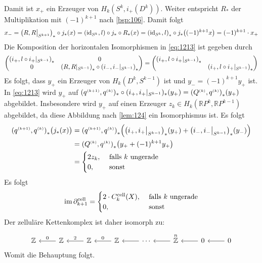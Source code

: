 \begin{beweis}
	Damit ist $x_+$ ein Erzeuger von $H_k(S^k,i_+(D^k))$. 
	Weiter entspricht $R_*$ der Multiplikation mit $(-1)^{k+1}$ nach \autoref{bsp:106}. Damit folgt
	\begin{align*}
		 x_- = \enbrace*{R,R\big|_{S^{k+1}}}_* \circ j_* (x) = \enbrace*{\id_{S^k},l} \circ j_* \circ R_*(x) = \enbrace*{\id_{S^k},l}_* \circ j_* \enbrace*{(-1)^{k+1}x} = 
		 (-1)^{k+1}\cdot x_+    
	\end{align*}
	Die Komposition der horizontalen Isomorphismen in \eqref{eq:1213} ist gegeben durch
	\[
		\begin{pmatrix}
			\enbrace*{i_+,l \circ i_+|_{S^{k-1}}}_* & 0 \\
			0 & \enbrace*{R,R|_{S^{k-1}}}_*  \circ \enbrace*{i_-, i_-|_{S^{k-1}}}_*
		\end{pmatrix}=
		\begin{pmatrix}
			\enbrace*{i_+, l \circ i_+|_{S^{k-1}}}_* & \\
			& \enbrace*{i_+,l \circ i_+|_{S^{k-1}}}_*
		\end{pmatrix}
	\]
	Es folgt, dass $y_+$ ein Erzeuger von $H_k(D^k,S^{k-1})$ ist und $y_- = (-1)^{k+1} y_+$
	ist. 
	In \eqref{eq:1213} wird $y_+$ auf $(q^\ssbrace{k+1},q^\ssbrace{k})_* \circ (i_+,i_+|_{S^{k-1}})_*(y_+) = \enbrace*{Q^\ssbrace{k},q^\ssbrace{k}}_*(y_+)$ abgebildet. 
	Insbesondere wird $y_+$ auf einen Erzeuger $z_k \in H_k(\mathbb{R}P^k,\mathbb{R}P^{k-1})$ abgebildet, da diese Abbildung nach \ref{lem:124} ein Isomorphismus ist. Es folgt 
	\begin{align*}
		\enbrace*{q^\ssbrace{k+1},q^\ssbrace{k}}_* \enbrace[\big]{j_*(x)} &= \enbrace*{q^\ssbrace{k+1},q^\ssbrace{k}}_* \enbrace*{\enbrace*{i_+,i_+\big|_{S^{k-1}}}_*(y_+) +
		\enbrace*{i_-,i_-\big|_{S^{k-1}}}_*(y_-) } \\
		&= \enbrace*{Q^\ssbrace{k},q^\ssbrace{k}}_* \enbrace*{y_+ + (-1)^{k+1} y_+} \\
		& = \begin{cases}
			2 z_k, &\text{ falls }k \text{ ungerade}\\
			0 , &\text{ sonst}
		\end{cases}  
	\end{align*}
	Es folgt 
	\[
		\im  \partial_{k+1}^{\cell} = \begin{cases}
		2 \cdot C^{\cell}_k(X), &\text{ falls } k \text{ ungerade}\\
		0 , &\text{ sonst}
	\end{cases}
	\]
	Der zelluläre Kettenkomplex ist daher isomorph zu:
	\[
		\begin{tikzcd}
			\mathbb{Z} & \mathbb{Z} \lar["0"'] & \mathbb{Z} \lar["2"'] & \mathbb{Z} \lar["0"'] & \cdots \lar & \overset{n}{\mathbb{Z}} \lar & 0 \lar & 0 \lar
		\end{tikzcd}
	\]
	Womit die Behauptung folgt.
\end{beweis}

